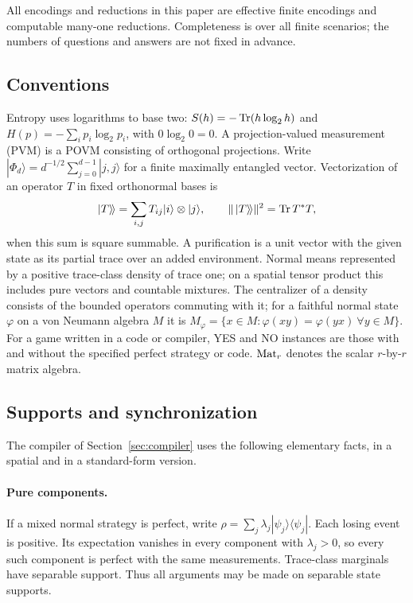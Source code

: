All encodings and reductions in this paper are effective finite encodings and computable many-one reductions. Completeness is over all finite scenarios; the numbers of questions and answers are not fixed in advance.

\subsection{Conventions}
Entropy uses logarithms to base two: $S(h)=-\operatorname{Tr}(h\log_2h)$ and $H(p)=-\sum_i p_i\log_2p_i$, with $0\log_2 0=0$. A projection-valued measurement (PVM) is a POVM consisting of orthogonal projections. Write $|\Phi_d\rangle=d^{-1/2}\sum_{j=0}^{d-1}|j,j\rangle$ for a finite maximally entangled vector. Vectorization of an operator $T$ in fixed orthonormal bases is
\[
 |T\rangle\!\rangle=\sum_{i,j}T_{ij}|i\rangle\otimes|j\rangle,
 \qquad \|\,|T\rangle\!\rangle\|^2=\operatorname{Tr} T^*T,
\]
when this sum is square summable. A purification is a unit vector with the given state as its partial trace over an added environment. Normal means represented by a positive trace-class density of trace one; on a spatial tensor product this includes pure vectors and countable mixtures. The centralizer of a density consists of the bounded operators commuting with it; for a faithful normal state $\varphi$ on a von Neumann algebra $M$ it is $M_\varphi=\{x\in M:\varphi(xy)=\varphi(yx)\ \forall y\in M\}$. For a game written in a code or compiler, YES and NO instances are those with and without the specified perfect strategy or code. $\mathrm{Mat}_r$ denotes the scalar $r$-by-$r$ matrix algebra.

\subsection{Supports and synchronization}\label{sec:support}
The compiler of Section~\ref{sec:compiler} uses the following elementary facts, in a spatial and in a standard-form version.

\paragraph{Pure components.}
If a mixed normal strategy is perfect, write $\rho=\sum_j\lambda_j|\psi_j\rangle\langle\psi_j|$. Each losing event is positive. Its expectation vanishes in every component with $\lambda_j>0$, so every such component is perfect with the same measurements. Trace-class marginals have separable support. Thus all arguments may be made on separable state supports.

